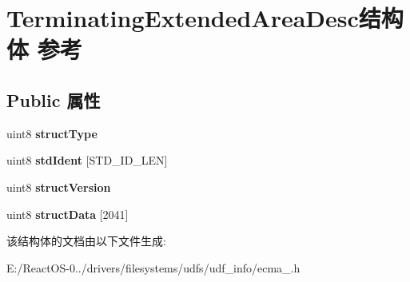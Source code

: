 \hypertarget{struct_terminating_extended_area_desc}{}\section{Terminating\+Extended\+Area\+Desc结构体 参考}
\label{struct_terminating_extended_area_desc}
\subsection*{Public 属性}
\begin{DoxyCompactItemize}
\item 
\mbox{\label{struct_terminating_extended_area_desc_a4ab7131bc3cd24144978797f2b2be99f}} 
uint8 {\bfseries struct\+Type}
\item 
\mbox{\label{struct_terminating_extended_area_desc_a26979cdd050310ab78de476b1662b21e}} 
uint8 {\bfseries std\+Ident} \mbox{[}S\+T\+D\+\_\+\+I\+D\+\_\+\+L\+EN\mbox{]}
\item 
\mbox{\label{struct_terminating_extended_area_desc_ab34d868974fa67833b722592450b654b}} 
uint8 {\bfseries struct\+Version}
\item 
\mbox{\label{struct_terminating_extended_area_desc_a04e1695d1ad45cbc07d46ea4dc71138c}} 
uint8 {\bfseries struct\+Data} \mbox{[}2041\mbox{]}
\end{DoxyCompactItemize}


该结构体的文档由以下文件生成\+:\begin{DoxyCompactItemize}
\item 
E\+:/\+React\+O\+S-\/0../drivers/filesystems/udfs/udf\+\_\+info/ecma\+\_.\+h\end{DoxyCompactItemize}
